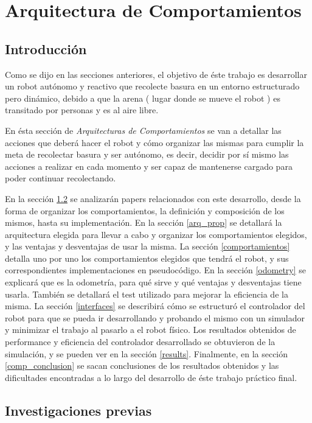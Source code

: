 \section{Arquitectura de Comportamientos}

\subsection{Introducci\'on}
Como se dijo en las secciones anteriores, el objetivo de \'este trabajo
es desarrollar un robot aut\'onomo y reactivo que recolecte basura en un entorno
estructurado pero din\'amico, debido a que la arena ( lugar donde se mueve el robot )
es transitado por personas y es al aire libre.

En \'esta secci\'on de \emph{Arquitecturas de Comportamientos} se van
a detallar las acciones que deber\'a hacer el robot y c\'omo organizar las mismas
para cumplir la meta de recolectar basura y ser aut\'onomo, es decir, decidir por
s\'i mismo las acciones a realizar en cada momento y ser capaz de mantenerse cargado
para poder continuar recolectando.

En la secci\'on \ref{inv_prev} se analizar\'an
papers relacionados con este desarrollo, desde la forma de organizar los comportamientos,
la definici\'on y composici\'on de los mismos, hasta su implementaci\'on. En la secci\'on
\ref{arq_prop} se detallar\'a la arquitectura elegida para llevar a cabo y organizar los
comportamientos elegidos, y las ventajas y desventajas de usar la misma. La secci\'on
\ref{comportamientos} detalla uno por uno los comportamientos elegidos que tendr\'a el
robot, y sus correspondientes implementaciones en pseudoc\'odigo. En la secci\'on
\ref{odometry} se explicar\'a que es la odometr\'ia, para qu\'e sirve y qu\'e ventajas y desventajas
tiene usarla. Tambi\'en se detallar\'a el test utilizado para mejorar la eficiencia de la misma.
La secci\'on \ref{interfaces} se describir\'a c\'omo se estructur\'o el controlador del robot
para que se pueda ir desarrollando y probando el mismo con un simulador y minimizar el trabajo
al pasarlo a el robot f\'isico. Los resultados obtenidos de performance y eficiencia del controlador
desarrollado se obtuvieron de la simulaci\'on, y se pueden ver en la secci\'on \ref{results}. Finalmente,
en la secci\'on \ref{comp_conclusion} se sacan conclusiones de los resultados obtenidos y las dificultades
encontradas a lo largo del desarrollo de \'este trabajo pr\'actico final.

\newpage

\subsection{Investigaciones previas}
\label{inv_prev}

